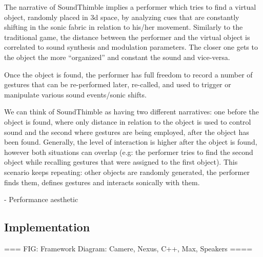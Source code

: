 \documentclass{nime-alternate}
\begin{document}
The narrative of SoundThimble implies a performer which tries to find a virtual object, randomly placed in 3d space, by analyzing cues that are constantly shifting in the sonic fabric in relation to his/her movement. Similarly to the traditional game, the distance between the performer and the virtual object is correlated to sound synthesis and modulation parameters. The closer one gets to the object the more “organized”  and constant the sound and vice-versa. 

Once the object is found, the performer has full freedom to record a number of gestures that can be re-performed later, re-called, and used to trigger or manipulate various sound events/sonic shifts. 




We can think of SoundThimble as having two different narratives: one before the object is found, where only distance in relation to the object is used to control sound and the second where gestures are being employed, after the object has been found. 
Generally, the level of interaction is higher after the object is found, however both situations can overlap (e.g: the performer tries to find the second object while recalling gestures that were assigned to the first object). This scenario keeps repeating: other objects are randomly generated, the performer finds them, defines gestures and interacts sonically with them.


- Performance aesthetic\\

\subsection{Implementation}

=== FIG: Framework Diagram: Camere, Nexus, C++, Max, Speakers ====
\end{document}

